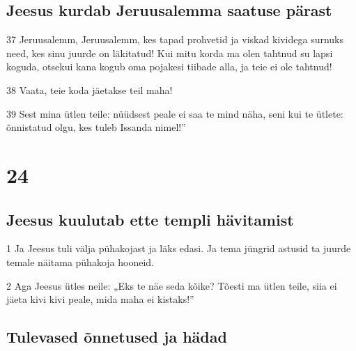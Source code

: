 \section*{Jeesus kurdab Jeruusalemma saatuse pärast}

\par 37 Jeruusalemm, Jeruusalemm, kes tapad prohvetid ja viskad kividega surnuks need, kes sinu juurde on läkitatud! Kui mitu korda ma olen tahtnud su lapsi koguda, otsekui kana kogub oma pojakesi tiibade alla, ja teie ei ole tahtnud!
\par 38 Vaata, teie koda jäetakse teil maha!
\par 39 Sest mina ütlen teile: nüüdsest peale ei saa te mind näha, seni kui te ütlete: õnnistatud olgu, kes tuleb Issanda nimel!”


\chapter{24}

\section*{Jeesus kuulutab ette templi hävitamist}

\par 1 Ja Jeesus tuli välja pühakojast ja läks edasi. Ja tema jüngrid astusid ta juurde temale näitama pühakoja hooneid.
\par 2 Aga Jeesus ütles neile: „Eks te näe seda kõike? Tõesti ma ütlen teile, siia ei jäeta kivi kivi peale, mida maha ei kistaks!”

\section*{Tulevased õnnetused ja hädad}

